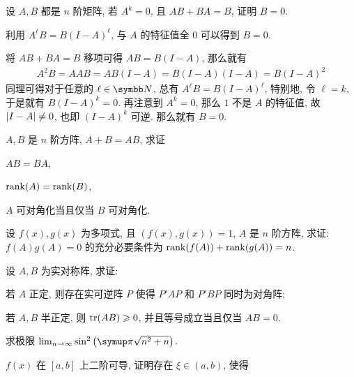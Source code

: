 \documentclass{ctexart}
\begin{document}
\begin{exercise}[series=exer]
    \item 设 $ A, B $ 都是 $ n $ 阶矩阵, 若 $ A^{k} = 0 $, 且 $ AB + BA = B $, 证明 $ B = 0 $. 
    \begin{hint}
        利用 $ A^{\ell}B = B(I - A)^{\ell} $, 与 $ A $ 的特征值全 $ 0 $ 可以得到 $ B = 0 $.
    \end{hint}
    \begin{answer}
        将 $ AB + BA = B $ 移项可得 $ AB = B(I - A) $, 那么就有
        \begin{align*}
            A^{2}B = AAB = AB(I - A) = B(I - A)(I - A) = B(I - A)^{2}
        \end{align*}
        同理可得对于任意的 $ \ell \in \N $, 总有 $ A^{\ell}B = B(I - A)^{\ell} $, 特别地, 令 $ \ell = k $, 于是就有 $ B(I - A)^{k} = 0 $. 再注意到 $ A^{k} = 0 $, 那么 $ 1 $ 不是 $ A $ 的特征值, 故 $ \abs{I - A} \ne 0 $, 也即 $ (I - A)^{k} $ 可逆. 那么就有 $ B = 0 $.
    \end{answer}
    \item $ A, B $ 是 $ n $ 阶方阵, $ A + B = AB $, 求证
    \begin{exercise}
        \item $ AB = BA $,
        \item $ \rank(A) = \rank(B) $,
        \item $ A $ 可对角化当且仅当 $ B $ 可对角化.
    \end{exercise}
    \item 设 $ f(x), g(x) $ 为多项式, 且 $ (f(x), g(x)) = 1 $, $ A $ 是 $ n $ 阶方阵, 求证: $ f(A)g(A) = 0 $ 的充分必要条件为 $ \rank(f(A)) + \rank(g(A)) = n $.
    \item 设 $ A, B $ 为实对称阵, 求证:
    \begin{exercise}
        \item 若 $ A $ 正定, 则存在实可逆阵 $ P $ 使得 $ P'AP $ 和 $ P'BP $ 同时为对角阵;
        \item 若 $ A, B $ 半正定, 则 $ \tr(AB) \geqslant 0 $, 并且等号成立当且仅当 $ AB = 0 $.
    \end{exercise}
    \item 
    \item 求极限 $ \limit{n}{\infty} \sin^{2}\qty(\pi \sqrt{n^{2} + n}) $.  
    \item $ f(x) $ 在 $ [a, b] $ 上二阶可导, 证明存在 $ \xi \in (a, b) $, 使得
    \begin{align*}

\end{align*}
\end{exercise}
\end{document}

